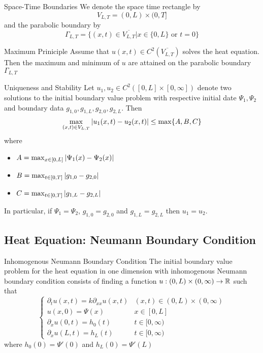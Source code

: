 \documentclass[a4paper]{article}
\begin{document}
\begin{defn}{Space-Time Boundaries}{} We denote the space time rectangle by $$V_{L,T}=(0,L)\times(0,T]$$ and the parabolic boundary by $$\Gamma_{L,T}=\{(x,t)\in\overline{V_{L,T}}|x\in\{0,L\}\text{ or }t=0\}$$
\end{defn}

\begin{thm}{Maximum Priniciple}{} Assume that $u(x,t)\in C^2(\overline{V_{L,T}})$ solves the heat equation. Then the maximum and minimum of $u$ are attained on the parabolic boundary $\Gamma_{L,T}$
\end{thm}

\begin{thm}{Uniqueness and Stability}{} Let $u_1,u_2\in C^2([0,L]\times[0,\infty])$ denote two solutions to the initial boundary value problem with respective initial date $\Psi_1,\Psi_2$ and boundary data $g_{1,0},g_{1,L},g_{2,0},g_{2,L}$. Then $$\max_{(x,t)\in V_{L,T}}\abs{u_1(x,t)-u_2(x,t)}\leq\max\{A,B,C\}$$ where 
\begin{itemize}
\item $A=\max_{x\in[0,L]}\abs{\Psi_1(x)-\Psi_2(x)}$
\item $B=\max_{t\in[0,T]}\abs{g_{1,0}-g_{2,0}}$
\item $C=\max_{t\in[0,T]}\abs{g_{1,L}-g_{2,L}}$
\end{itemize}
In particular, if $\Psi_1=\Psi_2$, $g_{1,0}=g_{2,0}$ and $g_{1,L}=g_{2,L}$ then $u_1=u_2$. 
\end{thm}

\subsection{Heat Equation: Neumann Boundary Condition}
\begin{defn}{Inhomogenous Neumann Boundary Condition}{} The initial boundary value problem for the heat equation in one dimension with inhomogenous Neumann boundary condition consists of finding a function $u:(0,L)\times(0,\infty)\to\mathbb{R}$ such that $$\begin{cases}
\partial_tu(x,t)=k\partial_{xx}u(x,t) & (x,t)\in(0,L)\times(0,\infty)\\
u(x,0)=\Psi(x) & x\in[0,L]\\
\partial_xu(0,t)=h_0(t) & t\in[0,\infty)\\
\partial_xu(L,t)=h_L(t) & t\in[0,\infty)
\end{cases}$$
where $h_0(0)=\Psi'(0)$ and $h_L(0)=\Psi'(L)$
\end{defn}
\end{document}
